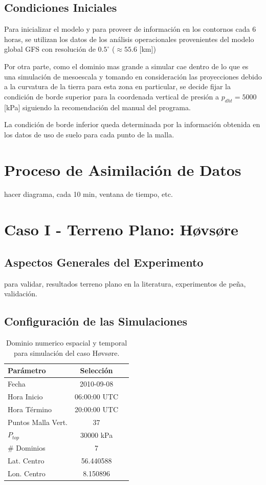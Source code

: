 \subsection{Condiciones Iniciales}
Para inicializar el modelo y para proveer de información en los contornos cada 6 horas, se utilizan los datos de los análisis operacionales provenientes del modelo global GFS con resolución de $0.5^\circ$ ($\approx 55.6$ [km])

Por otra parte, como el dominio mas grande a simular cae dentro de lo que es una simulación de mesoescala y tomando en consideración las proyecciones debido a la curvatura de la tierra para esta zona en particular, se decide fijar la condición de borde superior para la coordenada vertical de presión a $p_{dht} = 5000$ [kPa] siguiendo la recomendación del manual del programa.

La condición de borde inferior queda determinada por la información obtenida en los datos de uso de suelo para cada punto de la malla.
\section{Proceso de Asimilación de Datos}
hacer diagrama, cada 10 min, ventana de tiempo, etc.
\section{Caso I - Terreno Plano: Høvsøre}
\subsection{Aspectos Generales del Experimento}
para validar, resultados terreno plano en la literatura, experimentos de peña, validación.
\subsection{Configuración de las Simulaciones}
\begin{table}[h!]
	\caption{Dominio numerico espacial y temporal para simulación del caso Høvsøre.}\label{tab:05_config_hov}
	\centering\footnotesize
	\begin{tabular}{lcc}
		\toprule
		Parámetro & Selección \\
		\midrule
		Fecha	 	 & 2010-09-08   \\
		Hora Inicio	 	 & 06:00:00   UTC \\
		Hora Término	 		 & 20:00:00 UTC  \\
		Puntos Malla Vert.	 	 & 37   \\
		$P_{top}$ 	& 30000 kPa\\
		\# Dominios	& 7   \\
		Lat. Centro	& 56.440588   \\
		Lon. Centro	& 8.150896   \\
		\bottomrule
	\end{tabular}
\end{table}

